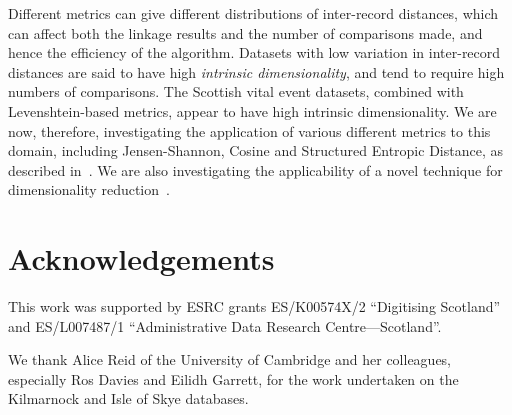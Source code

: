 \documentclass{llncs}
\begin{document}
Different metrics can give different distributions of inter-record distances, which can affect both the linkage results and the number of comparisons made, and hence the efficiency of the algorithm.
Datasets with low variation in inter-record distances are said to have high \textit{intrinsic dimensionality}, and tend to require high numbers of comparisons.
The Scottish vital event datasets, combined with Levenshtein-based metrics, appear to have high intrinsic dimensionality.
We are now, therefore, investigating the application of various different metrics to this domain, including Jensen-Shannon, Cosine and Structured Entropic Distance, as described in~\cite{Connor2016}. We are also investigating the applicability of a novel technique for dimensionality reduction~\cite{Connor2017}.


\section{Acknowledgements}

This work was supported by ESRC grants ES/K00574X/2 ``Digitising Scotland''
and ES/L007487/1 ``Administrative Data Research Centre---Scotland''.

We thank Alice Reid of the University of
Cambridge and her colleagues, especially Ros Davies and Eilidh Garrett,
for the work undertaken on the Kilmarnock and Isle of Skye databases.



 

\end{document}
